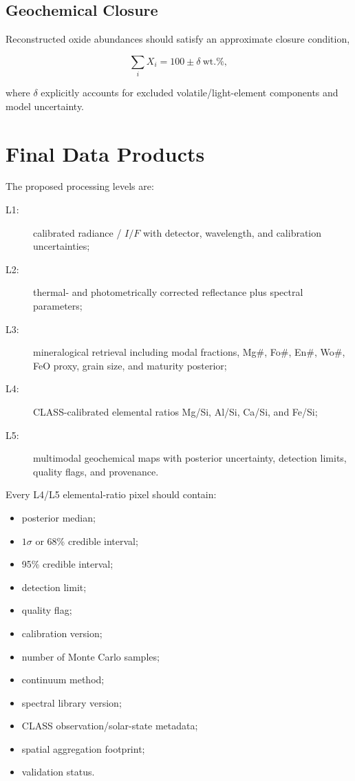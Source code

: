 \documentclass[11pt,a4paper]{article}
\begin{document}
\subsection{Geochemical Closure}

Reconstructed oxide abundances should satisfy an approximate closure condition,

\begin{equation}
\sum_i X_i
=
100\pm\delta~\mathrm{wt.\%},
\end{equation}

where $\delta$ explicitly accounts for excluded volatile/light-element components and model uncertainty.

\section{Final Data Products}

The proposed processing levels are:

\begin{description}
    \item[L1:] calibrated radiance / $I/F$ with detector, wavelength, and calibration uncertainties;
    \item[L2:] thermal- and photometrically corrected reflectance plus spectral parameters;
    \item[L3:] mineralogical retrieval including modal fractions, Mg\#, Fo\#, En\#, Wo\#, FeO proxy, grain size, and maturity posterior;
    \item[L4:] CLASS-calibrated elemental ratios Mg/Si, Al/Si, Ca/Si, and Fe/Si;
    \item[L5:] multimodal geochemical maps with posterior uncertainty, detection limits, quality flags, and provenance.
\end{description}

Every L4/L5 elemental-ratio pixel should contain:

\begin{itemize}
    \item posterior median;
    \item $1\sigma$ or 68\% credible interval;
    \item 95\% credible interval;
    \item detection limit;
    \item quality flag;
    \item calibration version;
    \item number of Monte Carlo samples;
    \item continuum method;
    \item spectral library version;
    \item CLASS observation/solar-state metadata;
    \item spatial aggregation footprint;
    \item validation status.
\end{itemize}
\end{document}

